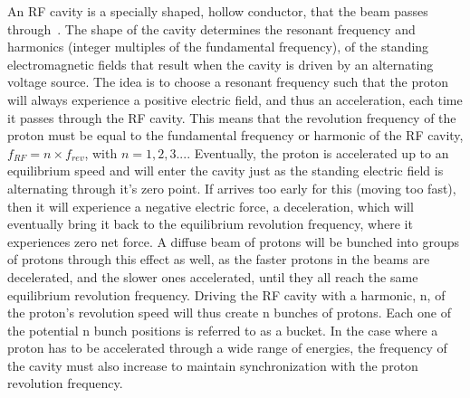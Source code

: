 \par An RF cavity is a specially shaped, hollow
conductor, that the beam passes
through~\cite{LHC:BasicsOfAccelerators_Baird}.  The shape of the
cavity determines the resonant frequency and harmonics (integer
multiples of the fundamental frequency), of the standing
electromagnetic fields that result when the cavity is driven by an
alternating voltage source.  The idea is to choose a resonant
frequency such that the proton will always experience a positive
electric field, and thus an acceleration, each time it passes through
the RF cavity.  This means that the revolution frequency of the proton
must be equal to the fundamental frequency or harmonic of the RF
cavity, $f_{RF} = n{\times}f_{rev}$, with $n=1,2,3...$.  Eventually,
the proton is accelerated up to an equilibrium speed and will enter the
cavity just as the standing electric field is alternating through it's
zero point.  If arrives too early for this (moving too fast), then it
will experience a negative electric force, a deceleration, which will
eventually bring it back to the equilibrium revolution frequency,
where it experiences zero net force.  A diffuse beam of protons will
be bunched into groups of protons through this effect as well, as the
faster protons in the beams are decelerated, and the slower ones
accelerated, until they all reach the same equilibrium revolution
frequency.  Driving  the RF cavity with a harmonic, n, of the proton's
revolution speed will thus create n bunches of protons.  Each one of
the potential n bunch positions is referred to as a bucket.  In the
case where a proton has to be accelerated through a wide range of
energies, the frequency of the cavity must also increase to maintain
synchronization with the proton revolution frequency.  

